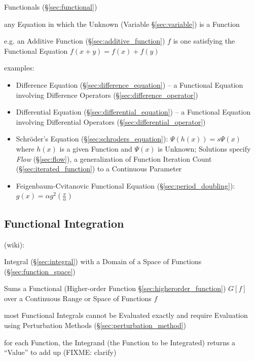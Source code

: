 
Functionals (\S\ref{sec:functional})

any Equation in which the Unknown (Variable \S\ref{sec:variable}) is a Function

e.g. an Additive Function (\S\ref{sec:additive_function}) $f$ is one satisfying
the Functional Equation $f(x + y) = f(x) + f(y)$


examples:
\begin{itemize}
  \item Difference Equation (\S\ref{sec:difference_equation}) -- a Functional
    Equation involving Difference Operators (\S\ref{sec:difference_operator})
  \item Differential Equation (\S\ref{sec:differential_equation}) -- a
    Functional Equation involving Differential Operators
    (\S\ref{sec:differential_operator})
  \item Schr\"oder's Equation (\S\ref{sec:schroders_equation}): $\Psi(h(x)) =
    s\Psi(x)$ where $h(x)$ is a given Function and $\Psi(x)$ is Unknown;
    Solutions specify \emph{Flow} (\S\ref{sec:flow}), a generalization of
    Function Iteration Count (\S\ref{sec:iterated_function}) to a Continuous
    Parameter
  \item Feigenbaum-Cvitanovic Functional Equation (\S\ref{sec:period_doubling}):
    $g(x) = \alpha g^2(\frac{x}{\alpha})$
\end{itemize}



\subsection{Functional Integration}\label{sec:functional_integration}

(wiki):

Integral (\S\ref{sec:integral}) with a Domain of a Space of Functions
(\S\ref{sec:function_space})

Sums a Functional (Higher-order Function \S\ref{sec:higherorder_function})
$G[f]$ over a Continuous Range or Space of Functions $f$

most Functional Integrals cannot be Evaluated exactly and require Evaluation
using Perturbation Methods (\S\ref{sec:perturbation_method})

for each Function, the Integrand (the Function to be Integrated) returns a
``Value'' to add up (FIXME: clarify)

